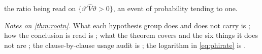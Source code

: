 \begin{theorem}
\[\]
the ratio being read on $\{\vartheta'\hat V\vartheta>0\}$, an event of probability tending to one.
\end{theorem}

\noindent\emph{Notes on \cref{thm:rootn}.} What each hypothesis group does and does not carry is
; how the conclusion is read is ; what the theorem
covers and the six things it does not are ; the clause-by-clause usage audit is
; the logarithm in \eqref{eq:phirate} is .

